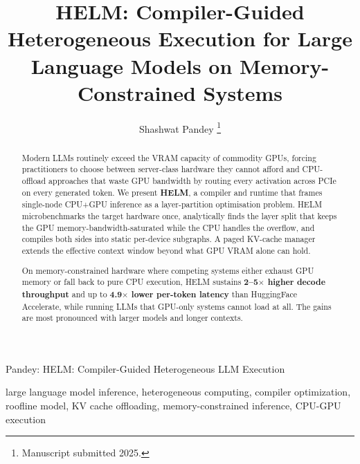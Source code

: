 \documentclass[lettersize,journal]{IEEEtran}
\begin{document}
\title{HELM: Compiler-Guided Heterogeneous Execution for Large Language Models on Memory-Constrained Systems}

\author{Shashwat Pandey
\thanks{Manuscript submitted 2025.}}

%
{Pandey: HELM: Compiler-Guided Heterogeneous LLM Execution}

\maketitle

\begin{abstract}
Modern LLMs routinely exceed the VRAM capacity of commodity GPUs, forcing
practitioners to choose between server-class hardware they cannot afford and
CPU-offload approaches that waste GPU bandwidth by routing every activation
across PCIe on every generated token.
We present \textbf{HELM}, a compiler and runtime that frames single-node
CPU+GPU inference as a layer-partition optimisation problem.
HELM microbenchmarks the target hardware once, analytically finds the layer
split that keeps the GPU memory-bandwidth-saturated while the CPU handles
the overflow, and compiles both sides into static per-device subgraphs.
A paged KV-cache manager extends the effective context window beyond what
GPU VRAM alone can hold.

On memory-constrained hardware where competing systems either exhaust GPU
memory or fall back to pure CPU execution, HELM sustains
\textbf{2--5$\times$ higher decode throughput} and up to
\textbf{4.9$\times$ lower per-token latency} than HuggingFace Accelerate,
while running LLMs that GPU-only systems cannot load at all.
The gains are most pronounced with larger models and longer contexts.
\end{abstract}

\begin{IEEEkeywords}
large language model inference, heterogeneous computing, compiler optimization,
roofline model, KV cache offloading, memory-constrained inference, CPU-GPU execution
\end{IEEEkeywords}
\end{document}
